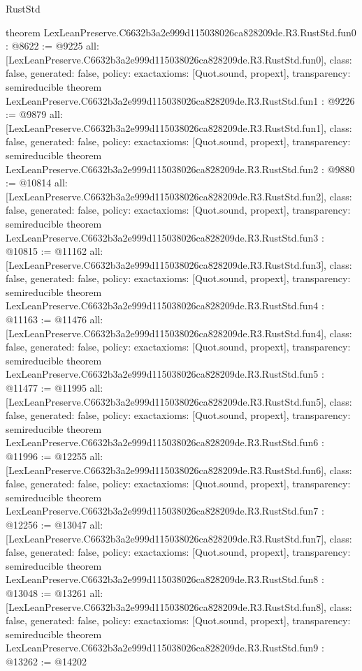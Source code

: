 \begin{lexlean}{RustStd}
\begin{coremodule}
{}
theorem LexLeanPreserve.C6632b3a2e999d115038026ca828209de.R3.RustStd.fun0 : @8622 := @9225 {
  all: [LexLeanPreserve.C6632b3a2e999d115038026ca828209de.R3.RustStd.fun0],
  class: false,
  generated: false,
  policy: exact{axioms: [Quot.sound, propext]},
  transparency: semireducible
}
theorem LexLeanPreserve.C6632b3a2e999d115038026ca828209de.R3.RustStd.fun1 : @9226 := @9879 {
  all: [LexLeanPreserve.C6632b3a2e999d115038026ca828209de.R3.RustStd.fun1],
  class: false,
  generated: false,
  policy: exact{axioms: [Quot.sound, propext]},
  transparency: semireducible
}
theorem LexLeanPreserve.C6632b3a2e999d115038026ca828209de.R3.RustStd.fun2 : @9880 := @10814 {
  all: [LexLeanPreserve.C6632b3a2e999d115038026ca828209de.R3.RustStd.fun2],
  class: false,
  generated: false,
  policy: exact{axioms: [Quot.sound, propext]},
  transparency: semireducible
}
theorem LexLeanPreserve.C6632b3a2e999d115038026ca828209de.R3.RustStd.fun3 : @10815 := @11162 {
  all: [LexLeanPreserve.C6632b3a2e999d115038026ca828209de.R3.RustStd.fun3],
  class: false,
  generated: false,
  policy: exact{axioms: [Quot.sound, propext]},
  transparency: semireducible
}
theorem LexLeanPreserve.C6632b3a2e999d115038026ca828209de.R3.RustStd.fun4 : @11163 := @11476 {
  all: [LexLeanPreserve.C6632b3a2e999d115038026ca828209de.R3.RustStd.fun4],
  class: false,
  generated: false,
  policy: exact{axioms: [Quot.sound, propext]},
  transparency: semireducible
}
theorem LexLeanPreserve.C6632b3a2e999d115038026ca828209de.R3.RustStd.fun5 : @11477 := @11995 {
  all: [LexLeanPreserve.C6632b3a2e999d115038026ca828209de.R3.RustStd.fun5],
  class: false,
  generated: false,
  policy: exact{axioms: [Quot.sound, propext]},
  transparency: semireducible
}
theorem LexLeanPreserve.C6632b3a2e999d115038026ca828209de.R3.RustStd.fun6 : @11996 := @12255 {
  all: [LexLeanPreserve.C6632b3a2e999d115038026ca828209de.R3.RustStd.fun6],
  class: false,
  generated: false,
  policy: exact{axioms: [Quot.sound, propext]},
  transparency: semireducible
}
theorem LexLeanPreserve.C6632b3a2e999d115038026ca828209de.R3.RustStd.fun7 : @12256 := @13047 {
  all: [LexLeanPreserve.C6632b3a2e999d115038026ca828209de.R3.RustStd.fun7],
  class: false,
  generated: false,
  policy: exact{axioms: [Quot.sound, propext]},
  transparency: semireducible
}
theorem LexLeanPreserve.C6632b3a2e999d115038026ca828209de.R3.RustStd.fun8 : @13048 := @13261 {
  all: [LexLeanPreserve.C6632b3a2e999d115038026ca828209de.R3.RustStd.fun8],
  class: false,
  generated: false,
  policy: exact{axioms: [Quot.sound, propext]},
  transparency: semireducible
}
theorem LexLeanPreserve.C6632b3a2e999d115038026ca828209de.R3.RustStd.fun9 : @13262 := @14202 {
}
\end{coremodule}
\end{lexlean}
